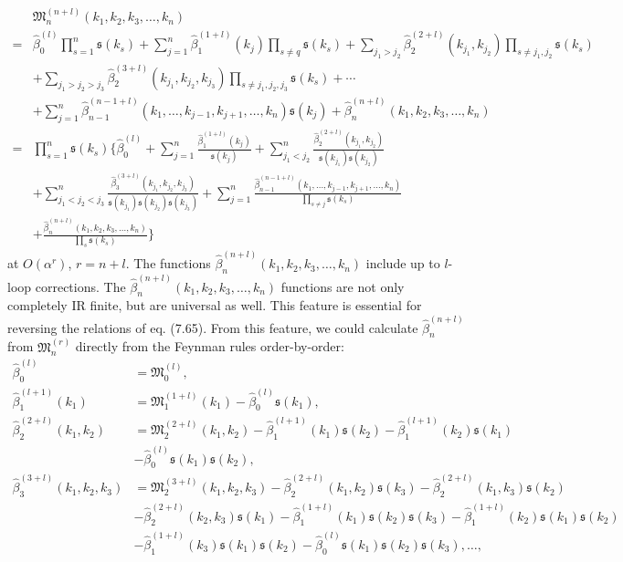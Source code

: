 \begin{align}
&\mathfrak{M}_n^{(n+l)}(k_1,k_2,k_3,\ldots,k_n)\nonumber\\
=&\hat{\beta}_0^{(l)}\prod_{s=1}^{n}\mathfrak{s}(k_s)+\sum_{j=1}^{n}\hat{\beta}_1^{(1+l)}(k_j)\prod_{s\ne q}\mathfrak{s}(k_s)+\sum_{j_1>j_2}\hat{\beta}_2^{(2+l)}(k_{j_1},k_{j_2})\prod_{s\ne j_1,j_2}\mathfrak{s}(k_s)\nonumber\\
&+\sum_{j_1>j_2>j_3}\hat{\beta}_2^{(3+l)}(k_{j_1},k_{j_2},k_{j_3})\prod_{s\ne j_1,j_2,j_3}\mathfrak{s}(k_s)+\cdots\nonumber\\
&+\sum_{j=1}^n\hat{\beta}_{n-1}^{(n-1+l)}(k_1,\ldots,k_{j-1},k_{j+1},\ldots,k_n)\mathfrak{s}(k_j)+\hat{\beta}_n^{(n+l)}(k_1,k_2,k_3,\ldots,k_n)\nonumber\\
=&\prod_{s=1}^{n}\mathfrak{s}(k_s)\biggl\{\hat{\beta}_0^{(l)} +\sum_{j=1}^n\frac{\hat{\beta}^{(1+l)}_1(k_j)}{\mathfrak{s}(k_j)}+\sum_{j_1<j_2}^n\frac{\hat{\beta}^{(2+l)}_2(k_{j_1},k_{j_2})}{\mathfrak{s}(k_{j_1})\mathfrak{s}(k_{j_2})}\nonumber\\ 
&+\sum_{j_1<j_2<j_3}^n\frac{\hat{\beta}^{(3+l)}_3(k_{j_1},k_{j_2},k_{j_3})}{\mathfrak{s}(k_{j_1})\mathfrak{s}(k_{j_2})\mathfrak{s}(k_{j_3})}+\sum_{j=1}^n\frac{\hat{\beta}^{(n-1+l)}_{n-1}(k_1,\ldots,k_{j-1},k_{j+1},\ldots,k_n)}{\prod_{s\ne j}\mathfrak{s}(k_s)}\nonumber\\
&+\frac{\hat{\beta}^{(n+l)}_{n}(k_1,k_2,k_3,\ldots,k_n)}{\prod_{s}\mathfrak{s}(k_s)} \biggr\}
\end{align}
at $O(\alpha^r)$, $r=n+l$. The functions $\hat{\beta}^{(n+l)}_n(k_1,k_2,k_3,\ldots,k_n)$ include up to $l$-loop corrections. The $\hat{\beta}^{(n+l)}_n(k_1,k_2,k_3,\ldots,k_n)$ functions are not only completely IR finite, but are universal as well. This feature is essential for reversing the relations of eq. (7.65). From this feature, we could calculate $\hat{\beta}^{(n+l)}_n$ from $\mathfrak{M}^{(r)}_n$ directly from the Feynman rules order-by-order:
\begin{align*}
\hat{\beta}^{(l)}_0&=\mathfrak{M}^{(l)}_0,\nonumber\\
\hat{\beta}^{(l+1)}_1(k_1)&=\mathfrak{M}^{(1+l)}_1(k_1)-\hat{\beta}^{(l)}_0\mathfrak{s}(k_1),\nonumber\\
\hat{\beta}^{(2+l)}_2(k_1,k_2)&=\mathfrak{M}^{(2+l)}_2(k_1,k_2)-\hat{\beta}^{(l+1)}_1(k_1)\mathfrak{s}(k_2)-\hat{\beta}^{(l+1)}_1(k_2)\mathfrak{s}(k_1)\nonumber\\
&-\hat{\beta}^{(l)}_0\mathfrak{s}(k_1)\mathfrak{s}(k_2),\nonumber\\
\hat{\beta}^{(3+l)}_3(k_1,k_2,k_3)&=\mathfrak{M}^{(3+l)}_2(k_1,k_2,k_3)-\hat{\beta}^{(2+l)}_2(k_1,k_2)\mathfrak{s}(k_3)-\hat{\beta}^{(2+l)}_2(k_1,k_3)\mathfrak{s}(k_2)\nonumber\\
&-\hat{\beta}^{(2+l)}_2(k_2,k_3)\mathfrak{s}(k_1)-\hat{\beta}^{(1+l)}_1(k_1)\mathfrak{s}(k_2)\mathfrak{s}(k_3)-\hat{\beta}^{(1+l)}_1(k_2)\mathfrak{s}(k_1)\mathfrak{s}(k_2)\nonumber\\
&-\hat{\beta}^{(1+l)}_1(k_3)\mathfrak{s}(k_1)\mathfrak{s}(k_2)-\hat{\beta}^{(l)}_0\mathfrak{s}(k_1)\mathfrak{s}(k_2)\mathfrak{s}(k_3),\ldots,
\end{align*}

